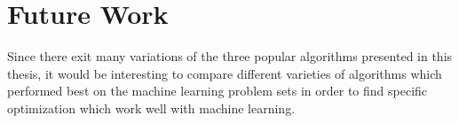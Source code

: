 \section{Future Work}

Since there exit many variations of the three popular algorithms presented in this thesis, it would be interesting to compare different varieties of algorithms which performed best on the machine learning problem sets in order to find specific optimization which work well with machine learning.
